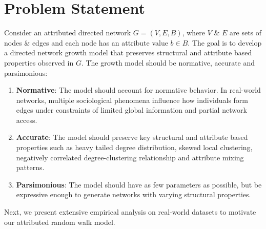 
\section{Problem Statement}
\label{sec:Problem Statement}

Consider an attributed directed network $G=(V,E,B)$, where $V$ \& $E$ are
sets of nodes \& edges and each node has an attribute value $b \in B$.
The goal is to develop a directed network growth model that preserves structural
and attribute based properties observed in $G$. The growth model should be
normative, accurate and parsimonious:
\begin{enumerate}
    \item \textbf{Normative}: The model should account for normative behavior. In real-world
    networks, multiple sociological phenomena influence how individuals form edges under
    constraints of limited global information and partial network access.
    \item \textbf{Accurate}: The model should preserve key structural
    and attribute based properties such as heavy tailed degree distribution, skewed
    local clustering, negatively correlated degree-clustering relationship
    and attribute mixing patterns.
    \item \textbf{Parsimonious}: The model should have as few parameters as possible, but be expressive enough to generate networks with varying structural properties.
\end{enumerate}

Next, we present extensive empirical analysis on real-world datasets to motivate our attributed random walk model.



